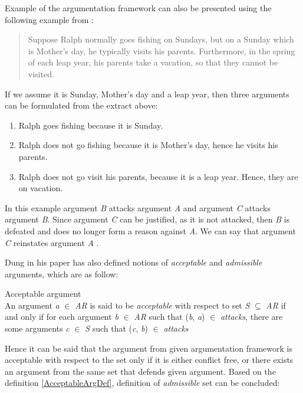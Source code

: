Example of the argumentation framework can also be presented using the following example from \citet{konolige1988defeasible}:
\begin{quote}
Suppose Ralph normally goes fishing on Sundays, but on a Sunday which is
Mother’s day, he typically visits his parents. Furthermore, in the spring of each
leap year, his parents take a vacation, so that they cannot be visited.
\end{quote}
If we assume it is Sunday, Mother's day and a leap year, then three arguments can be formulated from the extract above:
\begin{enumerate}[label=\Alph*]
	\item{Ralph goes fishing because it is Sunday.}
	\item{Ralph does not go fishing because it is Mother's day, hence he visits his parents.}
	\item{Ralph does not go visit his parents, because it is a leap year. Hence, they are on vacation.}
\end{enumerate}
In this example argument \textit{B} attacks argument \textit{A} and argument \textit{C} attacks argument \textit{B}. Since argument \textit{C} can be justified, as it is not attacked, then \textit{B} is defeated and does no longer form a reason against \textit{A}. We can say that argument \textit{C} reinstates argument \textit{A} \citep{caminada2004sake}.


Dung in his paper \citep{dung1995} has also defined notions of \textit{acceptable} and \textit{admissible} arguments, which are as follow:

\begin{definition}{Acceptable argument}
\label{AcceptableArgDef}\\
An argument \textit{a} $\in$ \textit{AR} is said to be \textit{acceptable} with respect to set \textit{S} $\subseteq$ \textit{AR} if and only if for each argument \textit{b} $\in$ \textit{AR} such that (\textit{b}, \textit{a}) $\in$ \textit{attacks}, there are some arguments \textit{c} $\in$ \textit{S} such that (\textit{c}, \textit{b}) $\in$ \textit{attacks}
\end{definition}

Hence it can be said that the argument from given argumentation framework is acceptable with respect to the set only if it is either conflict free, or there exists an argument from the same set that defends given argument. Based on the definition \ref{AcceptableArgDef}, definition of \textit{admissible} set can be concluded:

